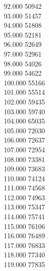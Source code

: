 { 92.000	50942 \\
 93.000	51457 \\
 94.000	51808 \\
 95.000	52181 \\
 96.000	52649 \\
 97.000	52961 \\
 98.000	54026 \\
 99.000	54622 \\
 100.000	55166 \\
 101.000	55514 \\
 102.000	59435 \\
 103.000	59740 \\
 104.000	65035 \\
 105.000	72030 \\
 106.000	72637 \\
 107.000	72954 \\
 108.000	73381 \\
 109.000	73683 \\
 110.000	74124 \\
 111.000	74568 \\
 112.000	74963 \\
 113.000	75347 \\
 114.000	75741 \\
 115.000	76106 \\
 116.000	76489 \\
 117.000	76833 \\
 118.000	77340 \\
 119.000	77835 \\
}
